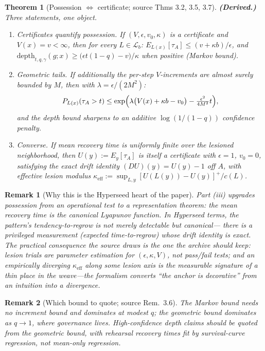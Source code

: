 \documentclass[11pt]{article}
\newtheorem{theorem}{Theorem}
\newtheorem{remark}{Remark}
\newcommand{\D}{D}
\newcommand{\Les}{\mathcal{L}}
\newcommand{\depth}{\mathrm{depth}}
\begin{document}
\begin{theorem}[Possession $\Leftrightarrow$ certificate; source Thms 3.2, 3.5, 3.7]\label{thm:rep}
\textbf{(Derived.)} Three statements, one object.
\begin{enumerate}[label=(\roman*)]
\item \emph{Certificates quantify possession.} If $(V,\epsilon,v_0,\kappa)$ is a
certificate and $V(x) = v < \infty$, then for every $L \in \Les_b$:
$E_{L(x)}[\tau_A] \le (v + \kappa b)/\epsilon$, and
$\depth_{t,q,\gamma}(g;x) \ge \bigl(\epsilon t(1-q) - v\bigr)/\kappa$ when positive
(Markov bound).
\item \emph{Geometric tails.} If additionally the per-step $V$-increments are almost
surely bounded by $M$, then with $\lambda = \epsilon/(2M^2)$:
\[
P_{L(x)}(\tau_A > t) \le \exp\Bigl( \lambda\bigl(V(x) + \kappa b - v_0\bigr) - \tfrac{\epsilon^2}{4M^2} t \Bigr),
\]
and the depth bound sharpens to an additive $\log(1/(1-q))$ confidence penalty.
\item \emph{Converse.} If mean recovery time is uniformly finite over the lesioned
neighborhood, then $U(y) := E_y[\tau_A]$ is itself a certificate with $\epsilon = 1$,
$v_0 = 0$, satisfying the exact drift identity $(\D U)(y) = U(y) - 1$ off $A$, with
effective lesion modulus $\kappa_{\mathrm{eff}} := \sup_{L,y} [U(L(y)) - U(y)]^{+}/c(L)$.
\end{enumerate}
\end{theorem}

\begin{remark}[Why this is the Hyperseed heart of the paper]
Part (iii) upgrades possession from an operational test to a \emph{representation
theorem}: the mean recovery time \emph{is} the canonical Lyapunov function. In Hyperseed
terms, the pattern's tendency-to-regrow is not merely detectable but \emph{canonical}---
there is a privileged measurement (expected time-to-regrow) whose drift identity is exact.
The practical consequence the source draws is the one the archive should keep: lesion
trials are \emph{parameter estimation} for $(\epsilon, \kappa, V)$, not pass/fail tests;
and an empirically diverging $\kappa_{\mathrm{eff}}$ along some lesion axis is the
measurable signature of a \emph{thin place in the weave}---the formalism converts ``the
anchor is decorative'' from an intuition into a divergence.
\end{remark}

\begin{remark}[Which bound to quote; source Rem.~3.6]
The Markov bound needs no increment bound and dominates at modest $q$; the geometric
bound dominates as $q \to 1$, where governance lives. High-confidence depth claims should
be quoted from the geometric bound, with rehearsal recovery times fit by survival-curve
regression, not mean-only regression.
\end{remark}
\end{document}
